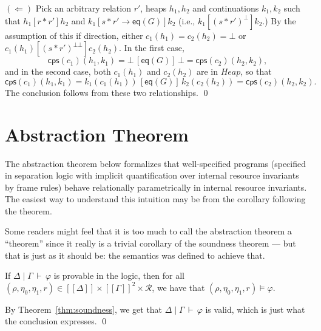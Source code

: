 \documentclass{LMCS}
\newcommand{\Heap}{\mathit{Heap}}
\newcommand{\Good}{\mathit{G}}
\newcommand{\cR}{\mathcal{R}}
\newcommand{\mperp}{{\bot{\!\!}\bot}}
\newcommand{\ff}[1]{[\![#1]\!]}
\newcommand{\EQ}{\mathsf{eq}}
\newcommand{\cps}{\mathsf{cps}}
\begin{document}
$(\Leftarrow)$ Pick an arbitrary relation $r'$, heaps $h_1,h_2$ and 
continuations $k_1,k_2$ such that $h_1[r*r']h_2$ and 
$k_1[s*r'\rightarrow \EQ(\Good)]k_2$ (i.e.,
$k_1[(s*r')^\bot]k_2$.) By the assumption of this if direction,
either  $c_1(h_1) = c_2(h_2) = \bot$ or 
$c_1(h_1)[(s*r')^\mperp]c_2(h_2)$.
In the first case,
$$
\cps(c_1)(h_1,k_1) = \bot\,[\EQ(\Good)]\,\bot = \cps(c_2)(h_2,k_2),
$$
and in the second case, both $c_1(h_1)$ and $c_2(h_2)$ are in $\Heap$,
so that
$$
  \cps(c_1)(h_1,k_1) = k_1(c_1(h_1))
  \,[\EQ(\Good)]\,
  k_2(c_2(h_2)) = \cps(c_2)(h_2,k_2).
$$
The conclusion follows from these two relationships.
\qed




\section{Abstraction Theorem}
\label{sec:abstraction-theorem}


The abstraction theorem below formalizes that well-specified programs
(specified in separation logic with implicit quantification over internal
resource invariants by frame rules) behave relationally parametrically in
internal resource invariants. The easiest way to understand this intuition 
may be from the corollary following the theorem.

Some readers might feel that it
is too much to call the abstraction theorem a ``theorem'' since 
it really is a trivial corollary of the soundness theorem
--- but that is just as it should be:
the semantics was defined to achieve that. 

\begin{thm}\label{thm:abstraction}
If $\Delta \mid \Gamma \,\vdash\, \varphi$ is provable in
the logic, then for all 
$(\rho,\eta_0,\eta_1,r) \in \ff{\Delta} \times \ff{\Gamma}^2 \times \cR$,
we have that $(\rho,\eta_0,\eta_1,r) \models \varphi$.
\end{thm}
\proof
  By Theorem~\ref{thm:soundness}, we get that 
  $\Delta \mid \Gamma \,\vdash\, \varphi$ is
  valid, which is just what the conclusion expresses.
\qed
\end{document}
